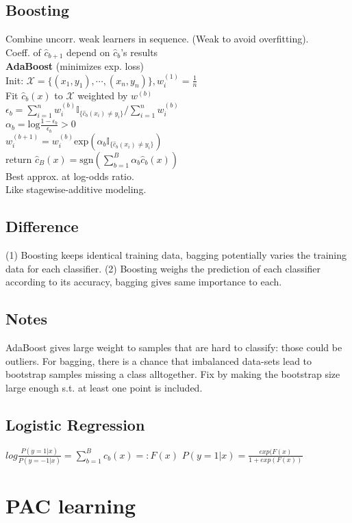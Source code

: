 \subsection*{Boosting}
Combine uncorr. weak learners in sequence. (Weak to avoid overfitting).\\
Coeff. of $\hat{c}_{b+1}$ depend on $\hat{c}_{b}$'s results\\
\textbf{AdaBoost} (minimizes exp. loss)\\
Init: $\mathcal{X}{=}\{(x_1,y_1),\cdots,(x_n,y_n)\}, w_i^{(1)}{=}\frac{1}{n}$\\
Fit  $\hat{c}_b(x)$ to $\mathcal{X}$ weighted by $w^{(b)}$\\
$\epsilon_b=\sum_{i=1}^nw_i^{(b)}\mathbb{I}_{\{\hat c_b(x_i)\not=y_i\}}/\sum_{i=1}^nw_i^{(b)}$\\
$\alpha_b = \mathrm{log}\frac{1-\epsilon_b}{\epsilon_b}>0$\\
$w_i^{(b+1)}=w_i^{(b)}\mathrm{exp}(\alpha_b\mathbb{I}_{\{{\hat c_b(x_i)\not=y_i}\}})$\\
return $\hat{c}_B(x){=}\mathrm{sgn}(\sum_{b{=}1}^B\alpha_b \hat c_b(x))$\\
Best approx. at log-odds ratio. \\
Like stagewise-additive modeling.

\subsection*{Difference}
(1) Boosting keeps identical training data, bagging potentially varies the training data for each classifier. (2) Boosting weighs the prediction of each classifier according to its accuracy, bagging gives same importance to each.

\subsection*{Notes}
AdaBoost gives large weight to samples that are hard to classify: those could be outliers. For bagging, there is a chance that imbalanced data-sets lead to bootstrap samples missing a class alltogether. Fix by making the bootstrap size large enough s.t. at least one point is included.
\subsection*{Logistic Regression}
$log\frac{P(y=1|x)}{P(y=-1|x)} = \sum_{b=1}^Bc_b(x) =: F(x)$
$P(y=1|x) = \frac{exp(F(x)}{1+exp(F(x))}$

\section*{PAC learning}
